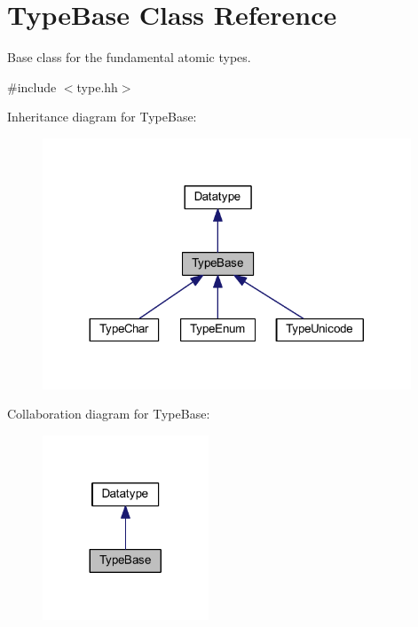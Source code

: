 \hypertarget{class_type_base}{}\section{Type\+Base Class Reference}
\label{class_type_base}


Base class for the fundamental atomic types.  




{\ttfamily \#include $<$type.\+hh$>$}



Inheritance diagram for Type\+Base\+:
\nopagebreak
\begin{figure}[H]
\begin{center}
\leavevmode
\includegraphics[width=311pt]{class_type_base__inherit__graph}
\end{center}
\end{figure}


Collaboration diagram for Type\+Base\+:
\nopagebreak
\begin{figure}[H]
\begin{center}
\leavevmode
\includegraphics[width=140pt]{class_type_base__coll__graph}
\end{center}
\end{figure}
